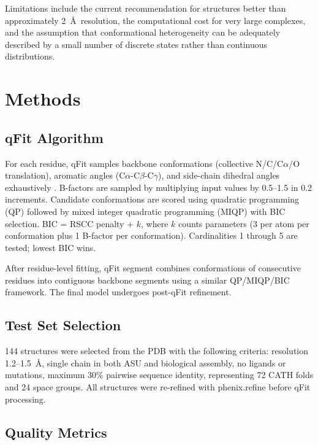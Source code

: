 \documentclass[11pt]{article}
\begin{document}
Limitations include the current recommendation for structures better than approximately 2~\AA\ resolution, the computational cost for very large complexes, and the assumption that conformational heterogeneity can be adequately described by a small number of discrete states rather than continuous distributions.

\section{Methods}

\subsection{qFit Algorithm}

For each residue, qFit samples backbone conformations (collective N/C/C$\alpha$/O translation), aromatic angles (C$\alpha$-C$\beta$-C$\gamma$), and side-chain dihedral angles exhaustively \citep{rotamer_library2011}. B-factors are sampled by multiplying input values by 0.5--1.5 in 0.2 increments. Candidate conformations are scored using quadratic programming (QP) \citep{quadratic_programming2014} followed by mixed integer quadratic programming (MIQP) \citep{miqp_optimization2018} with BIC selection. BIC = RSCC penalty + $k$, where $k$ counts parameters (3 per atom per conformation plus 1 B-factor per conformation). Cardinalities 1 through 5 are tested; lowest BIC wins.

After residue-level fitting, qFit segment combines conformations of consecutive residues into contiguous backbone segments using a similar QP/MIQP/BIC framework. The final model undergoes post-qFit refinement.

\subsection{Test Set Selection}

144 structures were selected from the PDB with the following criteria: resolution 1.2--1.5~\AA, single chain in both ASU and biological assembly, no ligands or mutations, maximum 30\% pairwise sequence identity, representing 72 CATH folds \citep{cath_database2019} and 24 space groups. All structures were re-refined with phenix.refine before qFit processing.

\subsection{Quality Metrics}
\end{document}
